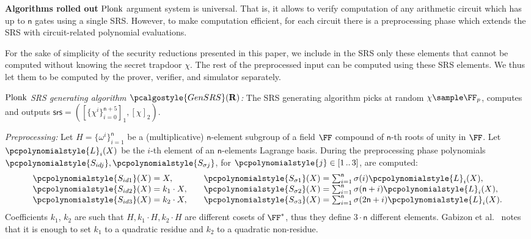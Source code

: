 \documentclass[10pt]{llncs}
\renewcommand{\kgen}{\pcalgostyle{GenSRS}}
\newcommand{\pcvarstyle}[1]{\mathsf{#1}}
\newcommand{\myskip}{-0.16\baselineskip}
\newcommand{\range}[2] {[#1 \, .. \, #2]}
\newcommand{\smallset}[1] {\{#1\}}
\newcommand{\p}[1]{\pcpolynomialstyle{#1}}
\newcommand{\numberofconstrains}{\pcvarstyle{n}}
\newcommand{\noofc}{\numberofconstrains}
\newcommand{\bmap}[2] {\left[#1\right]_{#2}}
\newcommand{\gone}[1] {\bmap{#1}{1}}
\newcommand{\gtwo}[1] {\bmap{#1}{2}}
\newcommand{\srs}{\pcvarstyle{srs}}
\newcommand{\lag}{\p{L}}
\newcommand{\REL}{\mathbf{R}}
\newcommand{\plonk}{\ensuremath{\textnormal{{Plonk}}}}
\newcommand{\oursubsub}[1] {\smallskip\noindent\textbf{#1}}
\newcommand{\ourpar}[1] {\smallskip\noindent\emph{#1}}
\begin{document}
\oursubsub{Algorithms rolled out}
\plonk{} argument system is universal. That is, it allows to verify computation
of any arithmetic circuit which has up to $\numberofconstrains$
gates using a single SRS. However, to make computation efficient, for each
circuit there is a preprocessing phase which extends the SRS with
circuit-related polynomial evaluations.

For the sake of simplicity of the security reductions presented in this paper, we
include in the SRS only these elements that cannot be computed without knowing
the secret trapdoor $\chi$. The rest of the preprocessed input can
be computed using these SRS elements. We thus let them to be computed by the
prover, verifier, and simulator separately.

\ourpar{$\plonk$ SRS generating algorithm $\kgen(\REL)$:}
The SRS generating algorithm picks at random $\chi \sample \FF_p$, computes
and outputs
\(
\srs = \left(\gone{\smallset{\chi^i}_{i = 0}^{\numberofconstrains + 5}},
\gtwo{\chi} \right).
\)

\ourpar{Preprocessing:}
Let $H = \smallset{\omega^i}_{i = 1}^{\numberofconstrains }$ be a
(multiplicative) $\numberofconstrains$-element subgroup of a field $\FF$
compound of $\numberofconstrains$-th roots of unity in $\FF$. Let $\lag_i(X)$ be
the $i$-th element of an $\numberofconstrains$-elements Lagrange basis. During
the preprocessing phase polynomials $\p{S_{id j}}, \p{S_{\sigma j}}$, for
$\p{j} \in \range{1}{3}$, are computed:
\begin{equation*}
\begin{aligned}
\p{S_{id 1}}(X) & = X,\\[\myskip]
\p{S_{id 2}}(X) & = k_1 \cdot X,\\[\myskip]
\p{S_{id 3}}(X) & = k_2 \cdot X,
\end{aligned}
\qquad
\begin{aligned}
\p{S_{\sigma 1}}(X) & = {\textstyle{\sum_{i = 1}^{\noofc} \sigma(i) \lag_i(X)}},\\[\myskip]
\p{S_{\sigma 2}}(X) & = {\textstyle \sum_{i = 1}^{\noofc}
	\sigma(\noofc + i) \lag_i(X)},\\[\myskip]
\p{S_{\sigma 3}}(X) & ={\textstyle\sum_{i = 1}^{\noofc} \sigma(2 \noofc + i) \lag_i(X)}.
\end{aligned}
\end{equation*}
Coefficients $k_1$, $k_2$ are such that $H, k_1 \cdot H, k_2 \cdot H$ are
different cosets of $\FF^*$, thus they define $3 \cdot \noofc$
different elements. Gabizon et al.~\cite{EPRINT:GabWilCio19} notes that it is enough to set
$k_1$ to a quadratic residue and $k_2$ to a quadratic non-residue.
\end{document}
